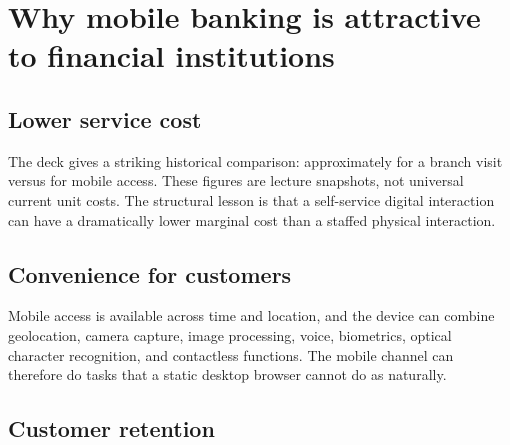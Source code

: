 \section{Why mobile banking is attractive to financial institutions}

\subsection{Lower service cost}

The deck gives a striking historical comparison: approximately  for a branch visit versus  for mobile access. These figures are lecture snapshots, not universal current unit costs. The structural lesson is that a self-service digital interaction can have a dramatically lower marginal cost than a staffed physical interaction.

\begin{mlfigure}
\end{mlfigure}

\subsection{Convenience for customers}

Mobile access is available across time and location, and the device can combine geolocation, camera capture, image processing, voice, biometrics, optical character recognition, and contactless functions. The mobile channel can therefore do tasks that a static desktop browser cannot do as naturally.

\subsection{Customer retention}

